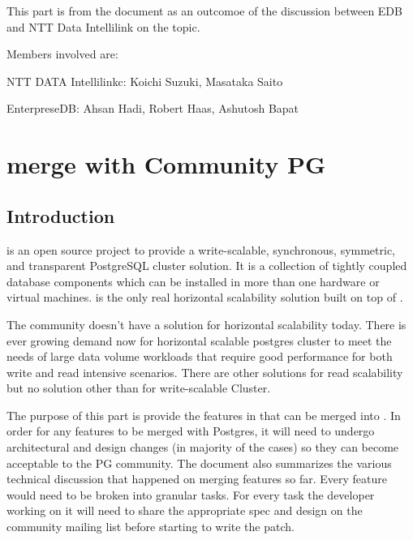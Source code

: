 %
%

	This part is from the document as an outcomoe of the discussion between EDB and NTT
	Data Intellilink on the topic.

	Members involved are:

	NTT DATA Intellilinkc: Koichi Suzuki, Masataka Saito

	EnterpreseDB: Ahsan Hadi, Robert Haas, Ashutosh Bapat



\chapter{\XC{} merge with Community PG}



\section{Introduction}

	\XC{} is an open source project to provide a write-scalable, synchronous,
	symmetric, and transparent PostgreSQL cluster solution.
	It is a collection of tightly coupled database components which
	can be installed in more than one hardware or virtual machines.
	\XC{} is the only real horizontal scalability solution built on top of \PG.

	The community \PG{} doesn't have a solution for horizontal scalability today.
	There is ever growing demand now for horizontal scalable postgres cluster
	to meet the needs of large data volume workloads that require good performance
	for both write and read intensive scenarios.
	There are other solutions for read scalability but no solution other than
	\XC{} for write-scalable \PG{} Cluster.

	The purpose of this part is provide the features in \XC{} that can be merged into \PG.
	In order for any features to be merged with Postgres, it will need to undergo
	architectural and design changes (in majority of the cases) so they can become
	acceptable to the PG community.
	The document also summarizes the various technical discussion that happened on
	merging \XC{} features so far.
	Every feature would need to be broken into granular tasks.
	For every task the developer working on it will need to share the appropriate
	spec and design on the community mailing list before starting to write the patch.

